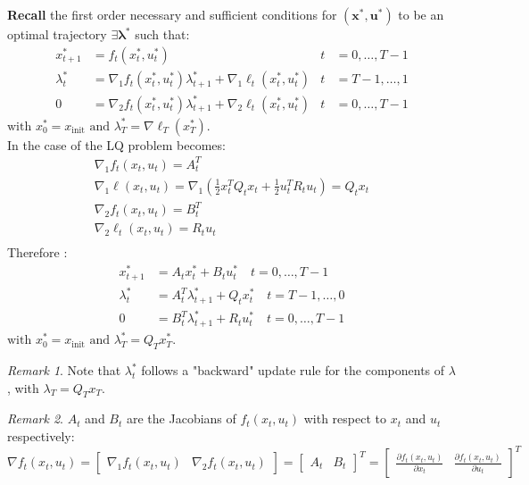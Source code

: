 \documentclass[openany]{book}
\theoremstyle{definition}
\theoremstyle{remark}
\newtheorem*{remark}{Remark}
\begin{document}
\textbf{Recall} the first order necessary and sufficient conditions for $(\mathbf{x}^*,\mathbf{u}^*)$ to be an optimal trajectory $\exists \boldsymbol{\lambda}^*$ such that:
\begin{align*}
    x^*_{t+1} &= f_t(x^*_t, u^*_t) & t &= 0,\ldots,T-1 \\
    \lambda^*_t &= \nabla_1 f_t(x^*_t, u^*_t)\lambda^*_{t+1} + \nabla_1 \ell_t(x^*_t, u^*_t) & t &= T-1,\ldots,1 \\
    0 &= \nabla_2 f_t(x^*_t, u^*_t)\lambda^*_{t+1} + \nabla_2 \ell_t(x^*_t, u^*_t) & t &= 0,\ldots,T-1
\end{align*}
$\text{with } x^*_0 = x_{\text{init}} \text{ and } \lambda^*_T = \nabla\ell_T(x^*_T).$\\
In the case of the LQ problem becomes:
\begin{gather*}
    \nabla_1f_t(x_t,u_t) = A_t^T\\
    \nabla_1\ell(x_t,u_t) = \nabla_1(\displaystyle\frac{1}{2}x_t^TQ_tx_t+\displaystyle\frac{1}{2}u_t^TR_tu_t)=Q_tx_t\\
    \nabla_2f_t(x_t,u_t) = B_t^T\\
    \nabla_2\ell_t(x_t,u_t) = R_tu_t\\
\end{gather*}
Therefore :
\begin{align*}
    x^*_{t+1} &= A_t x^*_t + B_t u^*_t \quad t=0,\dots,T-1\\
    \lambda_t^* &= A_t^T \lambda_{t+1}^* + Q_t x_t^* \quad t=T-1,\dots,0\\
    0 &= B_t^T \lambda_{t+1}^* + R_t u_t^* \quad t=0,\dots,T-1
\end{align*}
$\text{with } x^*_0 = x_{\text{init}} \text{ and } \lambda^*_T = Q_Tx^*_T.$

\begin{remark}
    Note that $\lambda_t^*$ follows a "backward" update rule for the components of $\lambda$, with $\lambda_T = Q_Tx_T$.
\end{remark}

\begin{remark}
$A_t$ and $B_t$ are the Jacobians of $f_t(x_t,u_t)$ with respect to $x_t$ and $u_t$ respectively:
\[
    \nabla f_t(x_t,u_t) = \begin{bmatrix}
        \nabla_1f_t(x_t,u_t) & \nabla_2f_t(x_t,u_t)
    \end{bmatrix} = \begin{bmatrix}
        A_t & B_t
    \end{bmatrix}^T = \begin{bmatrix}
        \frac{\partial f_t(x_t,u_t)}{\partial x_t} & \frac{\partial f_t(x_t,u_t)}{\partial u_t}
    \end{bmatrix}^T
\]
\end{remark}
\end{document}
